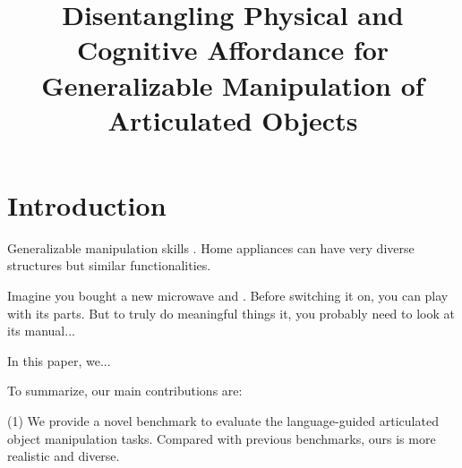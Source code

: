 \documentclass{article}
\title{Disentangling Physical and Cognitive Affordance for Generalizable Manipulation of Articulated Objects}
\author{
}
\newcommand{\jiahui}[1]{{\color{red}[Jiahui: #1]}}
\begin{document}
\maketitle


\begin{abstract}
    
\end{abstract}



\section{Introduction}




Generalizable manipulation skills .
Home appliances can have very diverse structures but similar functionalities.

Imagine you bought a new microwave and . Before switching it on, you can play with its parts. But to truly do meaningful things it, you probably need to look at its manual...

In this paper, we...

To summarize, our main contributions are:

(1) We provide a novel benchmark to evaluate the language-guided articulated object manipulation tasks. Compared with previous benchmarks, ours is more realistic and diverse.
\end{document}
